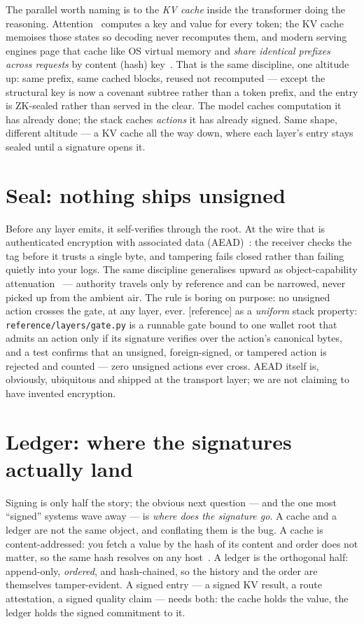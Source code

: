 \documentclass[11pt]{article}
\newcommand{\refimpl}{\textcolor{blue!70!black}{\small[reference]}}
\begin{document}
The parallel worth naming is to the \emph{KV cache} inside the transformer doing
the reasoning. Attention~\cite{attention} computes a key and value for every token;
the KV cache memoises those states so decoding never recomputes them, and modern
serving engines page that cache like OS virtual memory and \emph{share identical
prefixes across requests} by content (hash) key~\cite{pagedattention}. That is the
same discipline, one altitude up: same prefix, same cached blocks, reused not
recomputed --- except the structural key is now a covenant subtree rather than a
token prefix, and the entry is ZK-sealed rather than served in the clear. The model
caches computation it has already done; the stack caches \emph{actions} it has
already signed. Same shape, different altitude --- a KV cache all the way down,
where each layer's entry stays sealed until a signature opens it.
\section{Seal: nothing ships unsigned}

Before any layer emits, it self-verifies through the root. At the wire that is
authenticated encryption with associated data (AEAD)~\cite{rfc5116}: the receiver
checks the tag before it trusts a single byte, and tampering fails closed rather
than failing quietly into your logs. The same discipline generalises upward as
object-capability attenuation~\cite{ocap} --- authority travels only by reference
and can be narrowed, never picked up from the ambient air. The rule is boring on
purpose: no unsigned action crosses the gate, at any layer, ever. \refimpl{} as a
\emph{uniform} stack property: \texttt{reference/layers/gate.py} is a runnable gate
bound to one wallet root that admits an action only if its signature verifies over
the action's canonical bytes, and a test confirms that an unsigned, foreign-signed,
or tampered action is rejected and counted --- zero unsigned actions ever cross.
AEAD itself is, obviously, ubiquitous and shipped at the transport layer; we are not
claiming to have invented encryption.

\section{Ledger: where the signatures actually land}

Signing is only half the story; the obvious next question --- and the one most
``signed'' systems wave away --- is \emph{where does the signature go}. A cache and
a ledger are not the same object, and conflating them is the bug. A cache is
content-addressed: you fetch a value by the hash of its content and order does not
matter, so the same hash resolves on any host~\cite{merkle}. A ledger is the
orthogonal half: append-only, \emph{ordered}, and hash-chained, so the history and
the order are themselves tamper-evident. A signed entry --- a signed KV result, a
route attestation, a signed quality claim --- needs both: the cache holds the
value, the ledger holds the signed commitment to it.
\end{document}
